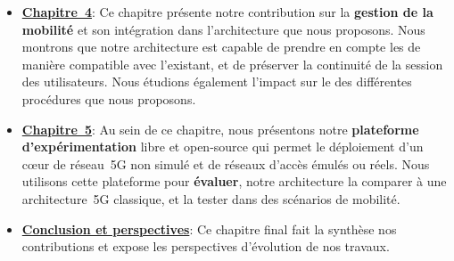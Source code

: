 \documentclass[../main.tex]{subfiles}
\begin{document}
\begin{itemize}
    \item \hyperref[ch:mobility]{\textbf{Chapitre~4}}:
    Ce chapitre présente notre contribution sur la \textbf{gestion de la mobilité} et son intégration dans l’architecture que nous proposons.
    Nous montrons que notre architecture est capable de prendre en compte les  de manière compatible avec l’existant, et de préserver la continuité de la session des utilisateurs.
    Nous étudions également l’impact sur le  des différentes procédures que nous proposons.
    \item \hyperref[ch:testbed]{\textbf{Chapitre~5}}:
    Au sein de ce chapitre, nous présentons notre \textbf{plateforme d’expérimentation} libre et open-source qui permet le déploiement d’un cœur de réseau~5G non simulé et de réseaux d’accès émulés ou réels.
    Nous utilisons cette plateforme pour \textbf{évaluer}, notre architecture la comparer à une architecture~5G classique, et la tester dans des scénarios de mobilité.

    \item \hyperref[ch:conclusion-perspectives]{\textbf{Conclusion et perspectives}}:
    Ce chapitre final fait la synthèse nos contributions et expose les perspectives d’évolution de nos travaux.

\end{itemize}
\end{document}
